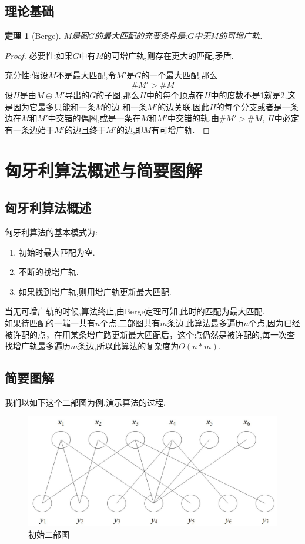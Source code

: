 \documentclass[a4paper,cs4size,oneside,fancyhdr]{ctexrep}
\theoremstyle{nonumberplain}%
\newtheorem{proof}{证明}
\newtheorem{theorem}{定理}
\theoremstyle{nonumberplain}%
\newtheorem{proof}{\hspace{2em}证}
\begin{document}
{{\section{理论基础}\label{LLJC}
\begin{theorem}[Berge]
$M$是图$G$的最大匹配的充要条件是:$G$中无$M$的可增广轨.
\end{theorem}
\begin{proof}
必要性:如果$G$中有$M$的可增广轨,则存在更大的匹配,矛盾.

充分性:假设$M$不是最大匹配,令$M'$是$G$的一个最大匹配,那么\[\#M'>\#M\]
设$H$是由$M\oplus M'$导出的$G$的子图,那么$H$中的每个顶点在$H$中的度数不是1就是2,这是因为它最多只能和一条$M$的边
和一条$M'$的边关联.因此$H$的每个分支或者是一条边在$M$和$M'$中交错的偶圈,或是一条在$M$和$M'$中交错的轨.由$\#M'>\#M$,
$H$中必定有一条边始于$M'$的边且终于$M'$的边,即$M$有可增广轨.~
\end{proof}



\chapter{匈牙利算法概述与简要图解}
\section{匈牙利算法概述}
匈牙利算法的基本模式为:
\begin{enumerate}
	\item 初始时最大匹配为空.
	\item 不断的找增广轨.
	\item 如果找到增广轨,则用增广轨更新最大匹配.
\end{enumerate}

当无可增广轨的时候,算法终止,由Berge定理可知,此时的匹配为最大匹配.\\
如果待匹配的一端一共有$n$个点,二部图共有$m$条边,此算法最多遍历$n$个点,因为已经被许配的点，在用某条增广路更新最大匹配后，这个点仍然是被许配的,每一次查找增广轨最多遍历$m$条边,所以此算法的复杂度为$O(n*m)$.

\section{简要图解}
我们以如下这个二部图为例,演示算法的过程.\\
\begin{figure}[htbp]%
\centering
\includegraphics[scale=0.45]{p1.jpg}
\caption{初始二部图}
\end{figure}

}}
\end{document}
